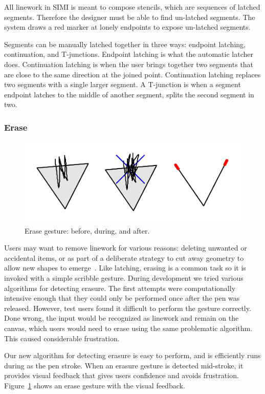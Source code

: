 \documentclass{article}
\begin{document}
All linework in SIMI is meant to compose stencils, which are sequences
of latched segments. Therefore the designer must be able to find
un-latched segments. The system draws a red marker at lonely endpoints
to expose un-latched segments.

Segments can be manually latched together in three ways: endpoint
latching, continuation, and T-junctions. Endpoint latching is what the
automatic latcher does. Continuation latching is when the user brings
together two segments that are close to the same direction at the
joined point. Continuation latching replaces two segments with a
single larger segment. A T-junction is when a segment endpoint latches
to the middle of another segment, splits the second segment in two.

\subsubsection{Erase}

\begin{figure}[h]
  \centering
  \includegraphics[width=0.9\linewidth]{img/erase-all.pdf}
  \caption{Erase gesture: before, during, and after.}
  \label{fig:erase}
\end{figure}

Users may want to remove linework for various reasons: deleting
unwanted or accidental items, or as part of a deliberate strategy to
cut away geometry to allow new shapes to
emerge~\cite{zeleznik-lineogrammer}. Like latching, erasing is a
common task so it is invoked with a simple scribble gesture. During
development we tried various algorithms for detecting erasure. The
first attempts were computationally intensive enough that they could
only be performed once after the pen was released. However, test users
found it difficult to perform the gesture correctly. Done wrong, the
input would be recognized as linework and remain on the canvas, which
users would need to erase using the same problematic algorithm. This
caused considerable frustration.

Our new algorithm for detecting erasure is easy to perform, and is
efficiently runs during as the pen stroke. When an erasure gesture is
detected mid-stroke, it provides visual feedback that gives users
confidence and avoids frustration. Figure~\ref{fig:erase} shows an
erase gesture with the visual feedback.
\end{document}
